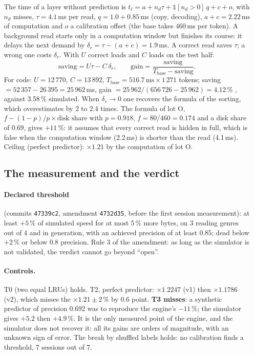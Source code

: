 The time of a layer without prediction is $t_\ell = a + n_d\tau + \mathbb{1}[n_d > 0]\,q + c + o$, with $n_d$ misses, $\tau = 4.1$\,ms per read, $q = 1.0 + 0.85$\,ms (copy, decoding), $a + c = 2.22$\,ms of computation and $o$ a calibration offset (the base takes 460\,ms per token). A background read starts only in a computation window but finishes its course: it delays the next demand by $\delta_r = \tau - (a + c) = 1.9$\,ms. A correct read saves $\tau$; a wrong one costs $\delta_r$. With $U$ correct loads and $C$ loads on the test half:
\begin{equation}\label{t3mim:eq:p4-gain}
\text{saving} = U\tau - C\,\delta_r, \qquad \text{gain} = \frac{\text{saving}}{T_{\text{base}} - \text{saving}} .
\end{equation}
For code: $U = 12\,770$, $C = 13\,892$, $T_{\text{base}} = 516.7\,\mathrm{ms} \times 1\,271$ tokens; saving $= 52\,357 - 26\,395 = 25\,962$\,ms, gain $= 25\,962 / (656\,726 - 25\,962) = 4.12\,\%$ \calc, against 3.58\,\% simulated. When $\delta_r \to 0$ one recovers the formula of the sorting, which overestimates by 2 to 2.4 times. The formula of lot O, $f - (1-p)/p \times \text{disk share}$ with $p = 0.918$, $f = 80/460 = 0.174$ and a disk share of 0.69, gives $+11\,\%$: it assumes that every correct read is hidden in full, which is false when the computation window (2.2\,ms) is shorter than the read (4.1\,ms). Ceiling (perfect predictor): $\times 1.21$ by the computation of lot O.

\subsection{The measurement and the verdict}\label{t3mim:sec:p4-verdict}

\paragraph{Declared threshold} (commits \texttt{47339c2}, amendment \texttt{4732d35}, before the first session measurement): at least $+5\,\%$ of simulated speed for at most 5\,\% more bytes, on 3 reading genres out of 4 and in generation, with an achieved precision of at least 0.85; dead below $+2\,\%$ or below 0.8 precision. Rule 3 of the amendment: as long as the simulator is not validated, the verdict cannot go beyond ``open''.

\paragraph{Controls.} T0 (two equal LRUs) holds. T2, perfect predictor: $\times 1.2247$ (v1) then $\times 1.1786$ (v2), which misses the $\times 1.21 \pm 2\,\%$ by 0.6 point. \textbf{T3 misses}: a synthetic predictor of precision 0.692 was to reproduce the engine's $-11\,\%$; the simulator gives $+5.2$ then $+4.9\,\%$. It is the only measured point of the engine, and the simulator does not recover it: all its gains are orders of magnitude, with an unknown sign of error. The break by shuffled labels holds: no calibration finds a threshold, 7 sessions out of 7.

